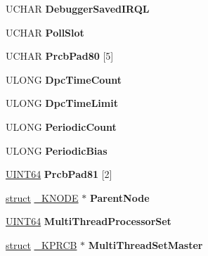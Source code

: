 \begin{DoxyCompactItemize}
U\+C\+H\+AR {\bfseries Debugger\+Saved\+I\+R\+QL}
\item 
\mbox{\label{struct___k_p_r_c_b_aafd27a4457704537caf2989ede8e166d}} 
U\+C\+H\+AR {\bfseries Poll\+Slot}
\item 
\mbox{\label{struct___k_p_r_c_b_aa48a793d6146bb8a0c7cdc52e360ac49}} 
U\+C\+H\+AR {\bfseries Prcb\+Pad80} \mbox{[}5\mbox{]}
\item 
\mbox{\label{struct___k_p_r_c_b_a8e98bcab913f976d50f8ba34888c0379}} 
U\+L\+O\+NG {\bfseries Dpc\+Time\+Count}
\item 
\mbox{\label{struct___k_p_r_c_b_a0974de3fee9a8a998effa7cda0df311e}} 
U\+L\+O\+NG {\bfseries Dpc\+Time\+Limit}
\item 
\mbox{\label{struct___k_p_r_c_b_a4cf92f20bf696613d27701a139d9f9b1}} 
U\+L\+O\+NG {\bfseries Periodic\+Count}
\item 
\mbox{\label{struct___k_p_r_c_b_a7bf1787c07c6be2e49d7df4a057b934a}} 
U\+L\+O\+NG {\bfseries Periodic\+Bias}
\item 
\mbox{\label{struct___k_p_r_c_b_a48c4525e8846c438a98ec32732892e78}} 
\hyperlink{_processor_bind_8h_a57be03562867144161c1bfee95ca8f7c}{U\+I\+N\+T64} {\bfseries Prcb\+Pad81} \mbox{[}2\mbox{]}
\item 
\mbox{\label{struct___k_p_r_c_b_ac1c6261e1ea7e3c768b8a6b72fd6c41f}} 
\hyperlink{interfacestruct}{struct} \hyperlink{struct___k_n_o_d_e}{\+\_\+\+K\+N\+O\+DE} $\ast$ {\bfseries Parent\+Node}
\item 
\mbox{\label{struct___k_p_r_c_b_ab2abe6c6f6e1018719af0f6ca0bc598d}} 
\hyperlink{_processor_bind_8h_a57be03562867144161c1bfee95ca8f7c}{U\+I\+N\+T64} {\bfseries Multi\+Thread\+Processor\+Set}
\item 
\mbox{\label{struct___k_p_r_c_b_a221715a2e87057600f4aca2693248aff}} 
\hyperlink{interfacestruct}{struct} \hyperlink{struct___k_p_r_c_b}{\+\_\+\+K\+P\+R\+CB} $\ast$ {\bfseries Multi\+Thread\+Set\+Master}

\end{DoxyCompactItemize}
